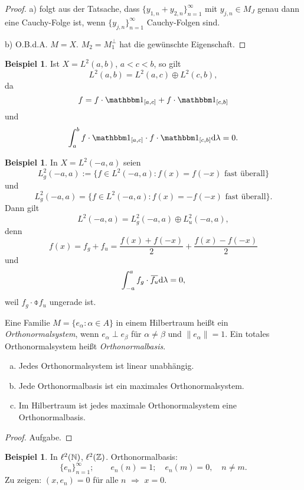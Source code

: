 \documentclass[
 a4paper,
 12pt,
 parskip=half
 ]{scrreprt}
\theoremstyle{plain}
\theoremstyle{definition}
\newtheorem{exmp}[thm]{Beispiel}
\numberwithin{equation}{section}
\begin{document}
\begin{proof}
  a) folgt aus der Tatsache, dass $\{ y_{1,n} + y_{2,n} \}_{n=1}^\infty$ mit
  $y_{j,n} \in M_J$ genau dann eine Cauchy-Folge ist, wenn
  $\{y_{j,n}\}_{n=1}^\infty$ Cauchy-Folgen sind.

  b) O.B.d.A. $M = X$. $M_2 = M_1^\perp$ hat die gewünschte Eigenschaft.
\end{proof}

\begin{exmp}
  Ist $X = L^2(a,b)$, $a < c < b$, so gilt
  \[ L^2(a,b) = L^2(a,c) \oplus L^2(c,b), \]
  da
  \[ f = f \cdot \ind_{[a,c]} + f \cdot \ind_{[c,b]} \]
  und
  \[ \int_a^b f \cdot \ind_{[a,c]} \cdot f \cdot \ind_{[c,b]} \diffop \lambda =
    0. \]
\end{exmp}

\begin{exmp}
  In $X = L^2(-a,a)$ seien
  \[ L_g^2(-a,a) := \{ f \in L^2(-a,a) :
    f(x) = f(-x) \text{ fast überall} \} \]
  und
  \[ L_g^2(-a,a) = \{ f \in L^2(-a,a) :
    f(x) = -f(-x) \text{ fast überall} \}. \]
  Dann gilt
  \[ L^2(-a,a) = L^2_g(-a,a) \oplus L^2_u(-a,a), \]
  denn
  \[ f(x) = f_g + f_u = \frac{f(x) + f(-x)}{2} + \frac{f(x) - f(-x)}{2} \]
  und
  \[ \int_{-a}^a f_g \cdot \obar{f_u} \diffop \lambda = 0, \]
  weil $f_g \cdot \obar{f_u}$ ungerade ist.
\end{exmp}

Eine Familie $M = \{ e_\alpha : \alpha \in A \}$ in einem Hilbertraum heißt ein
\emph{Orthonormalsystem}, wenn $e_\alpha \perp e_\beta$ für $\alpha \ne \beta$
und $\| e_\alpha \| = 1$. Ein totales Orthonormalsystem heißt
\emph{Orthonormalbasis}.

\clearpage

\begin{thm}
  \begin{enumerate}[a)]
  \item Jedes Orthonormalsystem ist linear unabhängig.
  \item Jede Orthonormalbasis ist ein maximales Orthonormalsystem.
  \item Im Hilbertraum ist jedes maximale Orthonormalsystem eine
    Orthonormalbasis.
  \end{enumerate}
\end{thm}

\begin{proof}
  Aufgabe.
\end{proof}

\begin{exmp}
  In $\ell^2(\mathbb{N})$, $\ell^2(\mathbb{Z})$. Orthonormalbasis:
  \[ \{ e_n \}_{n=1}^\infty; \qquad e_n(n) = 1; \quad e_n(m) = 0, \quad n \ne
    m. \]
  Zu zeigen: $(x,e_n) = 0$ für alle $n$ $\Rightarrow$ $x = 0$.
\end{exmp}
\end{document}
